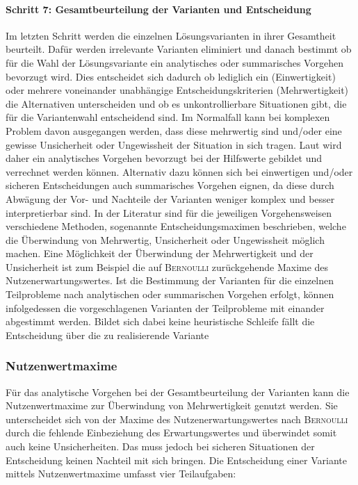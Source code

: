 \paragraph{Schritt 7: Gesamtbeurteilung der Varianten und Entscheidung} Im letzten Schritt werden die einzelnen Lösungsvarianten in ihrer Gesamtheit beurteilt. Dafür werden irrelevante Varianten eliminiert und danach bestimmt ob für die Wahl der Lösungsvariante ein analytisches oder summarisches Vorgehen bevorzugt wird. Dies entscheidet sich dadurch ob lediglich ein (Einwertigkeit) oder mehrere voneinander unabhängige Entscheidungskriterien (Mehrwertigkeit) die Alternativen unterscheiden und ob es unkontrollierbare Situationen gibt, die für die Variantenwahl entscheidend sind. Im Normalfall kann bei komplexen Problem davon ausgegangen werden, dass diese mehrwertig sind und/oder eine gewisse Unsicherheit oder Ungewissheit der Situation in sich tragen. Laut \cite{Grunig.2013} wird daher ein analytisches Vorgehen bevorzugt bei der Hilfswerte gebildet und verrechnet werden können. Alternativ dazu können sich bei einwertigen und/oder sicheren Entscheidungen auch summarisches Vorgehen eignen, da diese durch Abwägung der Vor- und Nachteile der Varianten weniger komplex und besser interpretierbar sind. 
In der Literatur sind für die jeweiligen Vorgehensweisen verschiedene Methoden, sogenannte Entscheidungsmaximen beschrieben, welche die Überwindung von Mehrwertig, Unsicherheit oder Ungewissheit möglich machen. Eine Möglichkeit der Überwindung der Mehrwertigkeit und der Unsicherheit ist zum Beispiel die auf \textsc{Bernoulli} zurückgehende Maxime des Nutzenerwartungswertes.\linebreak
Ist die Bestimmung der Varianten für die einzelnen Teilprobleme nach analytischen oder summarischen Vorgehen erfolgt, können infolgedessen die vorgeschlagenen Varianten der Teilprobleme mit einander abgestimmt werden. Bildet sich dabei keine heuristische Schleife fällt die Entscheidung über die zu realisierende Variante

\subsubsection{Nutzenwertmaxime}
Für das analytische Vorgehen bei der Gesamtbeurteilung der Varianten kann die Nutzenwertmaxime zur Überwindung von Mehrwertigkeit genutzt werden. Sie unterscheidet sich von der Maxime des Nutzenerwartungswertes nach \textsc{Bernoulli} durch die fehlende Einbeziehung des Erwartungswertes und überwindet somit auch keine Unsicherheiten. Das muss jedoch bei sicheren Situationen der Entscheidung keinen Nachteil mit sich bringen. Die Entscheidung einer Variante mittels Nutzenwertmaxime umfasst vier Teilaufgaben: 
\vspace*{-2.5mm}
